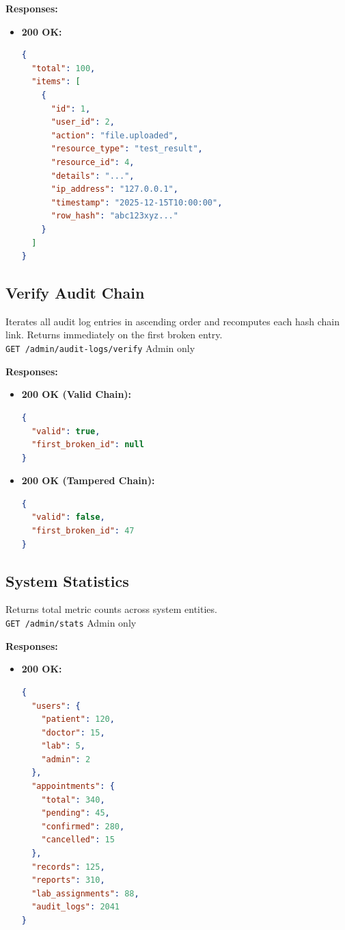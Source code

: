 \documentclass[a4paper,12pt]{report}
\begin{document}
\noindent\textbf{Responses:}
\begin{itemize}
    \item \textbf{200 OK:}
\begin{lstlisting}[language=json]
{
  "total": 100,
  "items": [
    {
      "id": 1,
      "user_id": 2,
      "action": "file.uploaded",
      "resource_type": "test_result",
      "resource_id": 4,
      "details": "...",
      "ip_address": "127.0.0.1",
      "timestamp": "2025-12-15T10:00:00",
      "row_hash": "abc123xyz..."
    }
  ]
}
\end{lstlisting}
\end{itemize}

\subsection{Verify Audit Chain}

Iterates all audit log entries in ascending order and recomputes each hash chain link. Returns immediately on the first broken entry. \\
\texttt{GET /admin/audit-logs/verify} \hfill Admin only

\noindent\textbf{Responses:}
\begin{itemize}
    \item \textbf{200 OK (Valid Chain):}
\begin{lstlisting}[language=json]
{
  "valid": true,
  "first_broken_id": null
}
\end{lstlisting}
    \item \textbf{200 OK (Tampered Chain):}
\begin{lstlisting}[language=json]
{
  "valid": false,
  "first_broken_id": 47
}
\end{lstlisting}
\end{itemize}

\subsection{System Statistics}

Returns total metric counts across system entities. \\
\texttt{GET /admin/stats} \hfill Admin only

\noindent\textbf{Responses:}
\begin{itemize}
    \item \textbf{200 OK:}
\begin{lstlisting}[language=json]
{
  "users": {
    "patient": 120,
    "doctor": 15,
    "lab": 5,
    "admin": 2
  },
  "appointments": {
    "total": 340,
    "pending": 45,
    "confirmed": 280,
    "cancelled": 15
  },
  "records": 125,
  "reports": 310,
  "lab_assignments": 88,
  "audit_logs": 2041
}
\end{lstlisting}
\end{itemize}
\end{document}
